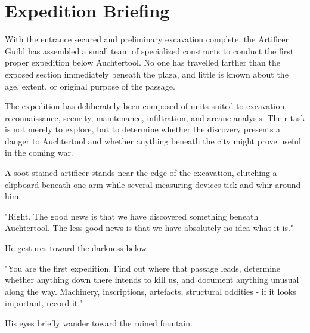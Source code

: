 \section*{Expedition Briefing}
{\entryfont With the entrance secured and preliminary excavation complete, the Artificer Guild has assembled a small team of specialized constructs to conduct the first proper expedition below Auchtertool. No one has travelled farther than the exposed section immediately beneath the plaza, and little is known about the age, extent, or original purpose of the passage.

The expedition has deliberately been composed of units suited to excavation, reconnaissance, security, maintenance, infiltration, and arcane analysis. Their task is not merely to explore, but to determine whether the discovery presents a danger to Auchtertool and whether anything beneath the city might prove useful in the coming war.}
\begin{DndReadAloud}
	A soot-stained artificer stands near the edge of the excavation, clutching a clipboard beneath one arm while several measuring devices tick and whir around him.

	"Right. The good news is that we have discovered something beneath Auchtertool. The less good news is that we have absolutely no idea what it is."

	He gestures toward the darkness below.

	"You are the first expedition. Find out where that passage leads, determine whether anything down there intends to kill us, and document anything unusual along the way. Machinery, inscriptions, artefacts, structural oddities - if it looks important, record it."

	His eyes briefly wander toward the ruined fountain.
\end{DndReadAloud}

\begin{BriefingPanel}[
	title		= {Mission Briefing},
	subtitle	= {Expedition Directives},
	crest		= \BriefingPanelCogwheelCompassNeedleCrest,
	divider		= \BriefingPanelOrnateGearDivider
]



\end{BriefingPanel}

